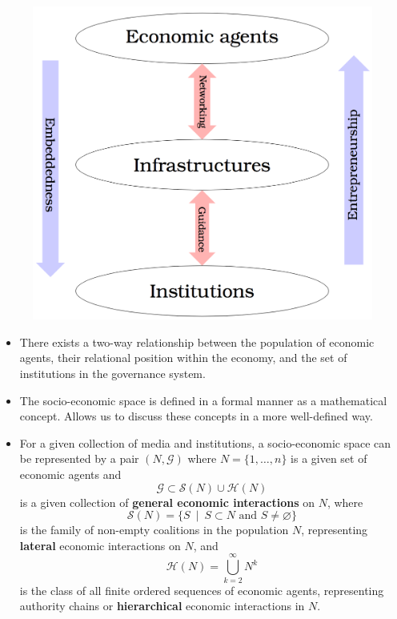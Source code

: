 \documentclass[10pt]{beamer}
\begin{document}
\begin{frame} %
\begin{figure}[h]
\centering
\includegraphics[scale=0.15]{../Images/structure-space.png}
\end{figure}
\begin{itemize}
\item There exists a two-way relationship between the population of economic agents, their relational position within the economy, and the set of institutions in the governance system.
\end{itemize}
\end{frame}


\begin{frame} %
\begin{itemize}
\item The socio-economic space is defined in a formal manner as a mathematical concept. Allows us to discuss these concepts in a more well-defined way.
\medskip
\item For a given collection of media and institutions, a socio-economic space can be represented by a pair $(N, \mathcal{G})$ where $N = \{1, \ldots, n\}$ is a given set of economic agents and
\begin{equation*}
\mathcal{G} \subset \mathcal{S}(N) \cup \mathcal{H}(N)
\end{equation*}
is a given collection of \textbf{general economic interactions} on $N$, where
\begin{equation*}
\mathcal{S}(N) = \{ S ~ \mid ~ S \subset N \mbox{ and } S \neq \varnothing \}
\end{equation*}
is the family of non-empty coalitions in the population $N$, representing \textbf{lateral} economic interactions on $N$, and
\begin{equation*}
\mathcal{H}(N) = \bigcup_{k = 2}^{\infty} N^{k}
\end{equation*}
is the class of all finite ordered sequences of economic agents, representing authority chains or \textbf{hierarchical} economic interactions in $N$.
\end{itemize}
\end{frame}
\end{document}
